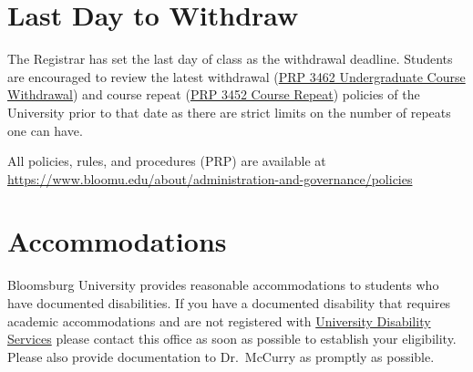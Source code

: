 \documentclass[11pt,letterpaper]{article}
\begin{document}
\section{Last Day to Withdraw}
The Registrar has set the last day of class as the withdrawal deadline.
Students are encouraged to review the latest withdrawal
(\href{https://www.bloomu.edu/prp-3462-undergraduate-course-withdrawal}{PRP 3462 Undergraduate
Course Withdrawal}) and course repeat
(\href{https://www.bloomu.edu/prp-3452-course-repeat}{PRP 3452 Course
Repeat}) policies of the
University prior to that date as there are strict limits on the number of
repeats one can have. 

\begin{mdframed}
	\centering
	All policies, rules, and procedures (PRP) are available at
	\url{https://www.bloomu.edu/about/administration-and-governance/policies}
\end{mdframed}

\section{Accommodations}
Bloomsburg University provides reasonable accommodations to students who have
documented disabilities. If you have a documented disability that requires
academic accommodations and are not registered with 
\href{https://bloomu.prod.acquia-sites.com/offices-directory/disability-services}{University
Disability Services}
please contact this office as soon as possible to establish your
eligibility. Please also provide documentation to Dr.\ McCurry as promptly as
possible.

%
\end{document}
